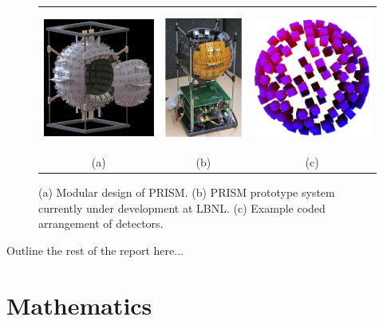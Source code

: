 \documentclass[10pt]{article}
\begin{document}
\vspace{10pt}
\begin{figure}[htb]
\hypertarget{fig1}{}
\centering
\begin{tabular}{ccc}
	\includegraphics[height=130pt]{Figures/PRISM_Design.png} & 
	\includegraphics[height=130pt]{Figures/PRISM_Prototype.png} & 
	\includegraphics[height=130pt]{Figures/Masked_Configuration.png} \\
	\scriptsize{(a)} & \scriptsize{(b)} & \scriptsize{(c)} \\[-6pt]
\end{tabular}
\caption{(a) Modular design of PRISM. (b) PRISM prototype system currently under development at LBNL. (c) Example coded arrangement of detectors.}
\end{figure}


Outline the rest of the report here...



\section{Mathematics}
\end{document}
